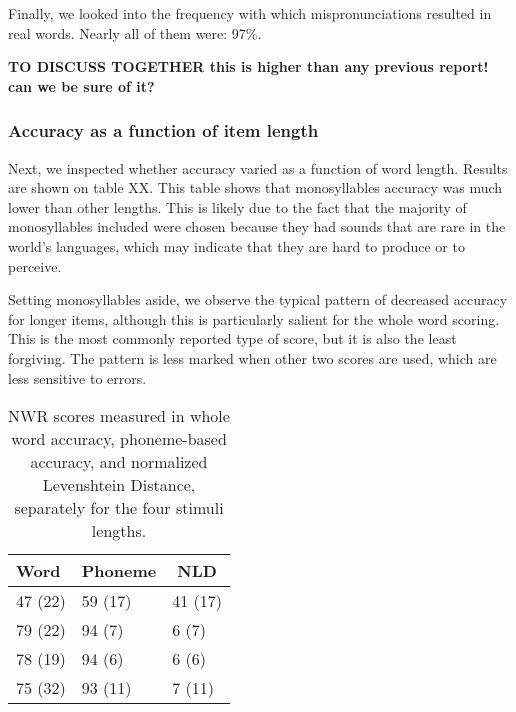 \documentclass[english,,man,floatsintext]{apa6}
\begin{document}
Finally, we looked into the frequency with which mispronunciations resulted in real words. Nearly all of them were: 97\%.

\textbf{TO DISCUSS TOGETHER this is higher than any previous report! can we be sure of it?}

\hypertarget{accuracy-as-a-function-of-item-length}{%
\subsubsection{Accuracy as a function of item length}\label{accuracy-as-a-function-of-item-length}}

Next, we inspected whether accuracy varied as a function of word length. Results are shown on table XX. This table shows that monosyllables accuracy was much lower than other lengths. This is likely due to the fact that the majority of monosyllables included were chosen because they had sounds that are rare in the world's languages, which may indicate that they are hard to produce or to perceive.

Setting monosyllables aside, we observe the typical pattern of decreased accuracy for longer items, although this is particularly salient for the whole word scoring. This is the most commonly reported type of score, but it is also the least forgiving. The pattern is less marked when other two scores are used, which are less sensitive to errors.

\begin{table}[tbp]

\begin{center}
\begin{threeparttable}

\caption{\label{tab:tablength}NWR scores measured in whole word accuracy, phoneme-based accuracy, and normalized Levenshtein Distance, separately for the four stimuli lengths.}

\begin{tabular}{lll}
\toprule
Word & \multicolumn{1}{c}{Phoneme} & \multicolumn{1}{c}{NLD}\\
\midrule
47 (22) & 59 (17) & 41 (17)\\
79 (22) & 94 (7) & 6 (7)\\
78 (19) & 94 (6) & 6 (6)\\
75 (32) & 93 (11) & 7 (11)\\
\bottomrule
\end{tabular}

\end{threeparttable}
\end{center}

\end{table}
\end{document}
